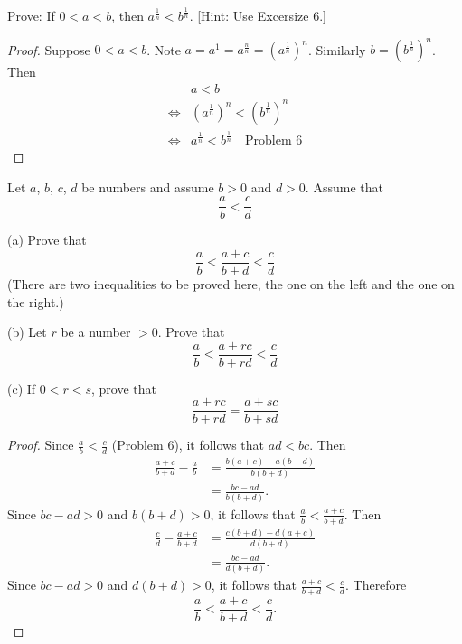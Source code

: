 \begin{tcolorbox}[title=Problem 7, breakable]
    Prove: If $0 < a < b$, then $a^{\frac{1}{n}} < b^{\frac{1}{n}}$. [Hint: Use Excersize $6$.]
\end{tcolorbox}

\begin{proof}
    Suppose $0 < a < b$.
    Note $a = a^{1} = a^{\frac{n}{n}} = \left(a^{\frac{1}{n}}\right)^n$.
    Similarly $b = \left(b^{\frac{1}{n}}\right)^n$.
    Then 
    \begin{align*}
        &a < b \\
        \iff &{\left(a^{\frac{1}{n}}\right)}^{n} < {\left(b^{\frac{1}{n}}\right)}^{n} \\
        \iff &a^{\frac{1}{n}} < b^{\frac{1}{n}} \quad \text{Problem 6}
    \end{align*}
\end{proof}

\begin{tcolorbox}[title=Problem 8, breakable]
    Let $a$, $b$, $c$, $d$ be numbers and assume $b > 0$ and $d > 0$. Assume that 
    \[\frac{a}{b} < \frac{c}{d}\]
    
    (a) Prove that 
    \[\frac{a}{b} < \frac{a + c}{b + d} < \frac{c}{d}\]
    (There are two inequalities to be proved here, the one on the left 
    and the one on the right.)

    (b) Let $r$ be a number $> 0$. Prove that \
    \[\frac{a}{b} < \frac{a + rc}{b + rd} < \frac{c}{d}\]
    
    (c) If $0 < r < s$, prove that 
    \[\frac{a + rc}{b + rd} = \frac{a + sc}{b + sd}\]
\end{tcolorbox}

\begin{proof}
    Since $\tfrac{a}{b} < \tfrac{c}{d}$ (Problem 6), it follows that $ad < bc$.  
    Then
    \begin{align*}
        \frac{a+c}{b+d} - \frac{a}{b}
        &= \frac{b(a+c) - a(b+d)}{b(b+d)} \\
        &= \frac{bc - ad}{b(b+d)}.
    \end{align*}
    Since $bc - ad > 0$ and $b(b+d) > 0$, it follows that $\frac{a}{b} < \frac{a+c}{b+d}$.
    Then
    \begin{align*}
        \frac{c}{d} - \frac{a+c}{b+d}
        &= \frac{c(b+d) - d(a+c)}{d(b+d)} \\
        &= \frac{bc - ad}{d(b+d)}.
    \end{align*}
    Since $bc - ad > 0$ and $d(b+d) > 0$, it follows that $\frac{a+c}{b+d} < \frac{c}{d}$.
    Therefore
    \[
        \frac{a}{b} < \frac{a+c}{b+d} < \frac{c}{d}.
    \]
\end{proof}

